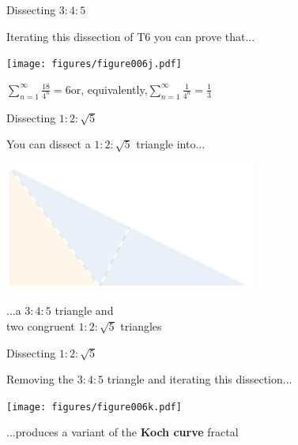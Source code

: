 \documentclass[14pt]{beamer}
\begin{document}

    \begin{frame}{Dissecting $3\!\!:\!\!4\!\!:\!\!5$}
        \begin{center}
            Iterating this dissection of T6 you can prove that...

            \bigskip \bigskip

            \texttt{[image: figures/figure006j.pdf]}

            \bigskip \bigskip

            $\displaystyle\sum_{n=1}^\infty{\tfrac{18}{4^n}} = 6$\qquad or, equivalently,\qquad$\displaystyle\sum_{n=1}^\infty{\tfrac{1}{4^n}} = \tfrac{1}{3}$\\[2ex]
        \end{center}
    \end{frame}


    \begin{frame}{Dissecting $1\!\!:\!\!2\!\!:\!\!\sqrt{5}$}
        \begin{center}
            You can dissect a $1\!\!:\!\!2\!\!:\!\!\sqrt{5}$ triangle into...

            \bigskip \bigskip

            \includegraphics[height=18ex]{figures/figure006e.pdf}

            \bigskip \bigskip

            ...a $3\!\!:\!\!4\!\!:\!\!5$ triangle and\\two congruent $1\!\!:\!\!2\!\!:\!\!\sqrt{5}$ triangles
        \end{center}
    \end{frame}


    \begin{frame}{Dissecting $1\!\!:\!\!2\!\!:\!\!\sqrt{5}$}
        \begin{center}
            Removing the $3\!\!:\!\!4\!\!:\!\!5$ triangle and iterating this dissection...

            \bigskip \bigskip

            \texttt{[image: figures/figure006k.pdf]}

            \bigskip \bigskip

            ...produces a variant of the \textbf{Koch curve} fractal\\[4ex]

        \end{center}
    \end{frame}
\end{document}
